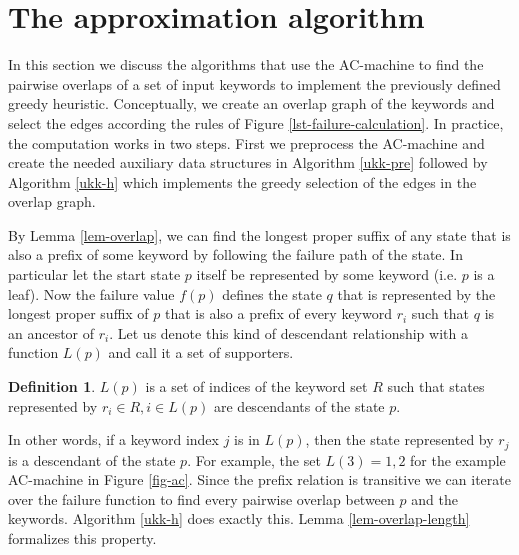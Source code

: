 \documentclass[english,twoside,censored,csm,algorithms-track-2020]{HYthesisML}
\theoremstyle{plain}
\theoremstyle{definition}
\newtheorem{definition}[theorem]{Definition}
\begin{document}
\section{The approximation algorithm}

In this section we discuss the algorithms that use the AC-machine to find the pairwise overlaps
of a set of input keywords to implement the previously defined greedy heuristic. Conceptually,
we create an overlap graph of the keywords and select the edges according the rules of
Figure \ref{lst-failure-calculation}. In practice, the computation works in two steps. First we
preprocess the AC-machine and create the needed auxiliary data structures in Algorithm \ref{ukk-pre}
followed by Algorithm \ref{ukk-h} which implements the greedy selection of the edges in the
overlap graph.

By Lemma \ref{lem-overlap}, we can find the longest proper suffix of any state that is also
a prefix of some keyword by following the failure path of the state. In particular let the start
state $p$ itself be represented by some keyword (i.e. $p$ is a leaf). Now the failure value $f(p)$
defines the state $q$ that is represented by the longest proper suffix of $p$ that is also a prefix
of every keyword $r_i$ such that $q$ is an ancestor of $r_i$.
Let us denote this kind of descendant relationship with a function $L(p)$ and call it a set of
supporters.

\begin{definition}
$L(p)$ is a set of indices of the keyword set $R$ such that states represented by
$r_i\in R, i\in L(p)$ are descendants of the state $p$.
\end{definition}

In other words, if a keyword index
$j$ is in $L(p)$, then the state represented by $r_j$ is a descendant of the state $p$.
For example, the set $L(3) = 1,2$ for the example AC-machine in Figure \ref{fig-ac}.
Since the prefix relation is transitive we can iterate over the failure function to find every
pairwise overlap between $p$ and the keywords. Algorithm \ref{ukk-h} does exactly this.
Lemma \ref{lem-overlap-length} formalizes this property.


\end{document}
